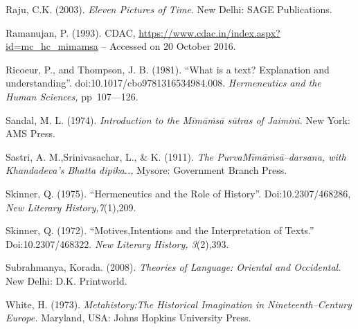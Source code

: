 \begin{thebibliography}{99}
  Raju, C.K. (2003). \textit{Eleven Pictures of Time}. New Delhi: SAGE Publications.

  Ramanujan, P. (1993). CDAC, \url{https://www.cdac.in/index.aspx?id=mc_hc_mimamsa} – Accessed on 20 October 2016.

  Ricoeur, P., and Thompson, J. B. (1981). “What is a text? Explanation and understanding”. doi:10.1017/cbo9781316534984.008. \textit{Hermeneutics and the Human Sciences,} pp~107––126.

  Sandal, M. L. (1974). \textit{Introduction to the Mīmāṁsā sūtras of Jaimini}. New York: AMS Press.

  Sastri, A. M.,Srinivasachar, L., \& K. (1911). \textit{The PurvaMīmāṁsā–darsana, with Khandadeva's Bhatta dipika..,} Mysore: Government Branch Press.

  Skinner, Q. (1975). “Hermeneutics and the Role of History”. Doi:10.2307/468286, \textit{New Literary History,7}(1),209.

  Skinner, Q. (1972). “Motives,Intentions and the Interpretation of Texts.” Doi:10.2307/468322. \textit{New Literary History, 3}(2),393.

  Subrahmanya, Korada. (2008). \textit{Theories of Language: Oriental and Occidental}. New Delhi: D.K. Printworld.

  White, H. (1973). \textit{Metahistory:The Historical Imagination in Nineteenth–Century Europe.} Maryland, USA: Johns Hopkins University Press.

 \end{thebibliography}

\theendnotes

